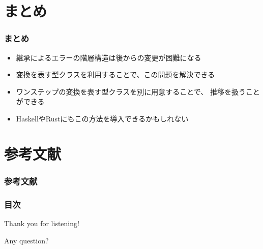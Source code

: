 \section{まとめ}
\begin{frame}[fragile]
  \frametitle{まとめ}

  \begin{itemize}
    \item<2-> 継承によるエラーの階層構造は後からの変更が困難になる
    \item<3-> 変換を表す型クラスを利用することで、この問題を解決できる
    \item<4-> ワンステップの変換を表す型クラスを別に用意することで、
      推移を扱うことができる
    \item<5-> HaskellやRustにもこの方法を導入できるかもしれない
  \end{itemize}
\end{frame}

\section*{参考文献}
\begin{frame}
  \frametitle{参考文献}

  \nocite{*}
  
  
\end{frame}

\begin{frame}
  \frametitle{目次}

  \tableofcontents[hideallsubsections]
\end{frame}

\begin{frame}
  \centering
  {\Huge Thank you for listening!}

  \quad \quad

  {\Huge Any question?}
\end{frame}


